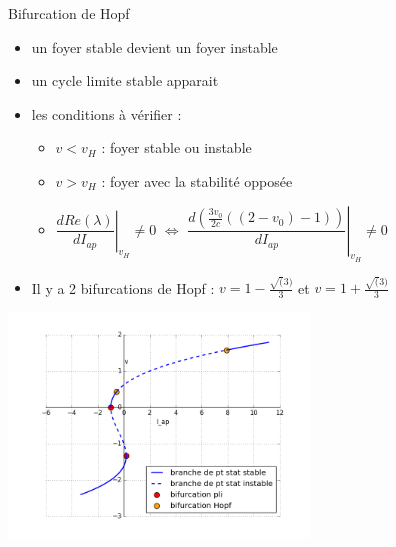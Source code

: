 \documentclass[xcolor={dvipsnames},10pt]{beamer}
\begin{document}
\begin{frame}{Bifurcation de Hopf}
\begin{itemize}
\item un foyer stable devient un foyer instable
\item un cycle limite stable apparait\\
\item les conditions à vérifier :
\begin{itemize}
\item $v < v_H$ : foyer stable ou instable
\item $v > v_H$ : foyer avec la stabilité opposée
\item $\left.\dfrac{dRe(\lambda)}{dI_{ap}}\right|_{v_H} \ne 0$ $\Leftrightarrow$ $\left.\dfrac{d\left(\frac{3v_0}{2c}((2-v_0) - 1)\right)}{dI_{ap}}\right|_{v_H} \ne 0$
\end{itemize}
\item<2> Il y a 2 bifurcations de Hopf : $v = 1 -\frac{\sqrt(3)}{3}$ et  $v = 1 +\frac{\sqrt(3)}{3}$
\end{itemize}
\end{frame}

\begin{frame}
\begin{center}
\includegraphics[width=0.6\textwidth]{bif4.png}
\end{center}
\end{frame}
\end{document}
